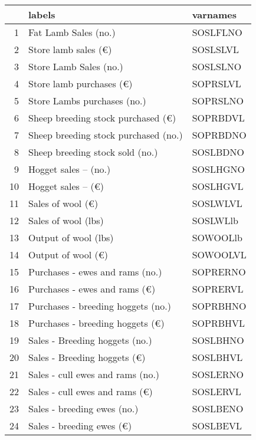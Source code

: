 \documentclass{article}\usepackage{graphicx, color}
\begin{document}
\begin{flushleft}
\newpage
\begin{table}[ht]
\begin{center}
\begin{tabular}{rll}
  \hline
 & labels & varnames \\ 
  \hline
1 & Fat Lamb Sales           (no.) & SOSLFLNO \\ 
  2 & Store lamb sales         (€) & SOSLSLVL \\ 
  3 & Store Lamb Sales         (no.) & SOSLSLNO \\ 
  4 & Store lamb purchases     (€) & SOPRSLVL \\ 
  5 & Store Lambs purchases    (no.) & SOPRSLNO \\ 
  6 & Sheep breeding stock purchased (€) & SOPRBDVL \\ 
  7 & Sheep breeding stock purchased (no.) & SOPRBDNO \\ 
  8 & Sheep breeding stock sold      (no.) & SOSLBDNO \\ 
  9 & Hogget sales --    (no.) & SOSLHGNO \\ 
  10 & Hogget sales --     (€) & SOSLHGVL \\ 
  11 & Sales of wool             (€) & SOSLWLVL \\ 
  12 & Sales of wool             (lbs) & SOSLWLlb \\ 
  13 & Output of wool            (lbs) & SOWOOLlb \\ 
  14 & Output of wool            (€) & SOWOOLVL \\ 
  15 & Purchases - ewes and rams     (no.) & SOPRERNO \\ 
  16 & Purchases - ewes and rams     (€) & SOPRERVL \\ 
  17 & Purchases - breeding hoggets  (no.) & SOPRBHNO \\ 
  18 & Purchases - breeding hoggets  (€) & SOPRBHVL \\ 
  19 & Sales - Breeding hoggets      (no.) & SOSLBHNO \\ 
  20 & Sales - Breeding hoggets      (€) & SOSLBHVL \\ 
  21 & Sales - cull ewes and rams    (no.) & SOSLERNO \\ 
  22 & Sales - cull ewes and rams    (€) & SOSLERVL \\ 
  23 & Sales - breeding ewes         (no.) & SOSLBENO \\ 
  24 & Sales - breeding ewes         (€) & SOSLBEVL \\ 

\end{tabular}
\end{center}
\end{table}
\end{flushleft}
\end{document}
